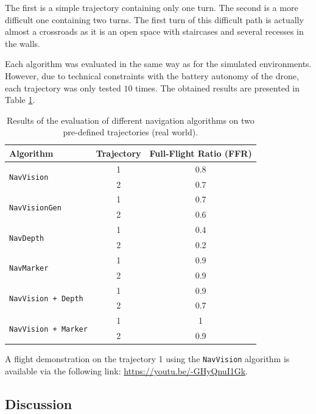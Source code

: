 The first is a simple trajectory containing only one turn. The second is a more difficult one containing two turns. The first turn of this difficult path is actually almost a crossroads as it is an open space with staircases and several recesses in the walls.

Each algorithm was evaluated in the same way as for the simulated environments. However, due to technical constraints with the battery autonomy of the drone, each trajectory was only tested $\num{10}$ times. The obtained results are presented in Table \ref{tab:07.evaluation.results}.

\begin{table}[t]
    \centering
    \begin{tabular}{|l|c|c|}
        \hline
        \textbf{Algorithm} & \textbf{Trajectory} & \textbf{Full-Flight Ratio} (FFR) \\ \hline
        \hline
        \multirow{2}{*}{\texttt{NavVision}} & 1 & \num{0.8} \\ \cline{2-3}
        & 2 & \num{0.7} \\ \hline
        \multirow{2}{*}{\texttt{NavVisionGen}} & 1 & \num{0.7} \\ \cline{2-3}
        & 2 & \num{0.6} \\ \hline
        \multirow{2}{*}{\texttt{NavDepth}} & 1 & \num{0.4} \\ \cline{2-3}
        & 2 & \num{0.2} \\ \hline
        \multirow{2}{*}{\texttt{NavMarker}} & 1 & \num{0.9} \\ \cline{2-3}
        & 2 & \num{0.9} \\ \hline
        \multirow{2}{*}{\texttt{NavVision + Depth}} & 1 & \num{0.9} \\ \cline{2-3}
        & 2 & \num{0.7} \\ \hline
        \multirow{2}{*}{\texttt{NavVision + Marker}} & 1 & \num{1} \\ \cline{2-3}
        & 2 & \num{0.9} \\ \hline
    \end{tabular}
    \caption{Results of the evaluation of different navigation algorithms on two pre-defined trajectories (real world).}
    \label{tab:07.evaluation.results}
\end{table}

A flight demonstration on the trajectory 1 using the \texttt{NavVision} algorithm is available via the following link: \url{https://youtu.be/-GHyQnuI1Gk}.

\subsection{Discussion}

